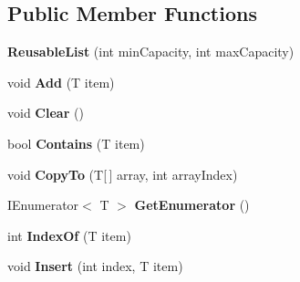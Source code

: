 \subsection*{Public Member Functions}
\begin{DoxyCompactItemize}
\item 
\mbox{\label{class_r_j_c_p_1_1_datastructures_1_1_reusable_list_a1ff9eea431e5c99e2d8f2945104db4b1}} 
{\bfseries Reusable\+List} (int min\+Capacity, int max\+Capacity)
\item 
\mbox{\label{class_r_j_c_p_1_1_datastructures_1_1_reusable_list_a2c5859f6d84616955b5b985ba33f01c2}} 
void {\bfseries Add} (T item)
\item 
\mbox{\label{class_r_j_c_p_1_1_datastructures_1_1_reusable_list_a03e8452e16d991942f5a5377b6f3b11d}} 
void {\bfseries Clear} ()
\item 
\mbox{\label{class_r_j_c_p_1_1_datastructures_1_1_reusable_list_ae53271c2c85e657a0444249c4a5b7724}} 
bool {\bfseries Contains} (T item)
\item 
\mbox{\label{class_r_j_c_p_1_1_datastructures_1_1_reusable_list_a18b68cf7d8cf5b44c67cc21e1ac78f84}} 
void {\bfseries Copy\+To} (T\mbox{[}$\,$\mbox{]} array, int array\+Index)
\item 
\mbox{\label{class_r_j_c_p_1_1_datastructures_1_1_reusable_list_a21081c41a6f0e24ee9ec68335b4bd39a}} 
I\+Enumerator$<$ T $>$ {\bfseries Get\+Enumerator} ()
\item 
\mbox{\label{class_r_j_c_p_1_1_datastructures_1_1_reusable_list_a452eccaac252d15aa22111873da991ea}} 
int {\bfseries Index\+Of} (T item)
\item 
\mbox{\label{class_r_j_c_p_1_1_datastructures_1_1_reusable_list_aa5ffbadd3ec2adc18a455a64de894679}} 
void {\bfseries Insert} (int index, T item)
\item 

\end{DoxyCompactItemize}
